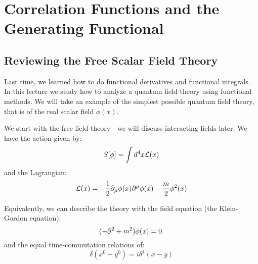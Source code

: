 \section{Correlation Functions and the Generating Functional}

\subsection{Reviewing the Free Scalar Field Theory}

Last time, we learned how to do functional derivatives and functional integrals. In this lecture we study how to analyze a quantum field theory using functional methods. We will take an example of the simplest possible quantum field theory, that is of the real scalar field $\phi(x)$. 

We start with the free field theory - we will discuss interacting fields later. We have the action given by:
\begin{equation}
    S[\varphi] = \int d^4x \L(x)
\end{equation}
and the Lagrangian:
\begin{equation}
    \L(x) = -\frac{1}{2}\p_\mu \phi(x) \p^\mu\phi(x) - \frac{m}{2}\phi^2(x)
\end{equation}

Equivalently, we can describe the theory with the field equation (the Klein-Gordon equation):
\begin{equation}
    (-\p^2 + m^2)\phi(x) = 0.
\end{equation}
and the equal time-commutation relations of:
\begin{equation}
    [\phi(x), \dpd{}{y^0}\phi(y)]\delta(x^0 - y^0) = i\delta^4(x - y)
\end{equation}

